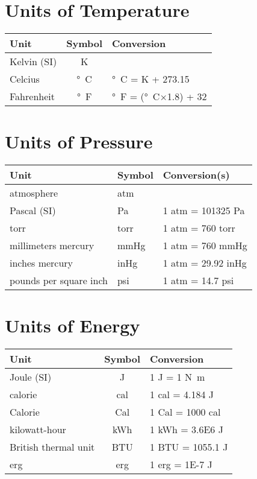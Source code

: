 \documentclass[10pt]{article}
\begin{document}
    \sectionspace
    \begin{minipage}[t]{0.5\textwidth}
        \section*{Units of Temperature}
        \begin{tabular}{l c l}
            Unit            & Symbol           & Conversion  \\
            \hline
            Kelvin (SI)     & \si{K}           & \\
            Celcius         & \si{\degree C}   & \si{\degree C} = \si{K} + 273.15 \\
            Fahrenheit      & \si{\degree F}   & \si{\degree F} = (\si{\degree C}$\times$1.8) + 32 \\
        \end{tabular}
        \sectionspace
        \section*{Units of Pressure}
        \begin{tabular}{l l l}
            Unit        & Symbol            & Conversion(s)  \\
            \hline
            atmosphere      & \si{atm}   &  \\
            Pascal (SI)     & \si{Pa}    & 1 \si{atm} = 101325 \si{Pa} \\
            torr            & \si{torr}  & 1 \si{atm} = 760 \si{torr} \\
            millimeters mercury & \si{mmHg} & 1 \si{atm} = 760 \si{mmHg} \\
            inches mercury & \si{inHg} & 1 \si{atm} = 29.92 \si{inHg} \\
            pounds per square inch & \si{psi} & 1 \si{atm} = 14.7 \si{psi} \\
        \end{tabular}
        \sectionspace
        \section*{Units of Energy}
        \begin{tabular}{l c l}
            Unit        & Symbol            & Conversion  \\
            \hline
            Joule (SI)      & \si{J}          & 1 \si{J} = 1 \si{N.m} \\
            calorie         & \si{cal}   & 1 \si{cal} = 4.184 \si{J} \\
            Calorie      & \si{Cal}   & 1 \si{Cal} = 1000 \si{cal} \\
            kilowatt-hour   & \si{kWh}   & 1 \si{kWh} = \num{3.6E6} \si{J} \\
            British thermal unit   & \si{BTU}   & 1 \si{BTU} = 1055.1 \si{J} \\
            erg   & \si{erg}   & 1 \si{erg} = \num{1E-7} \si{J} \\
        \end{tabular}
    \end{minipage}%
\end{document}
